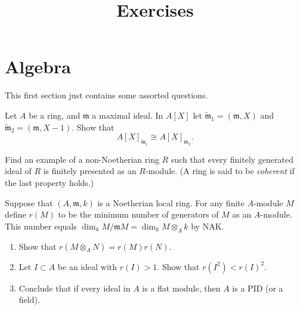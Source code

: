 

%


\title{Exercises}


\maketitle

\label{section-phantom}

\tableofcontents


\section{Algebra}
\label{section-algebra}

\noindent
This first section just contains some assorted questions.

\begin{exercise}
\label{exercise-isomorphism-localizations}
Let $A$ be a ring, and ${\mathfrak m}$ a maximal ideal. In $A[X]$
let $\tilde {\mathfrak m}_1 = ({\mathfrak m}, X)$ and
$\tilde {\mathfrak m}_2 = ({\mathfrak m}, X-1)$. Show
that
$$
A[X]_{\tilde {\mathfrak m}_1} \cong A[X]_{\tilde {\mathfrak m}_2}.
$$
\end{exercise}

\begin{exercise}
\label{exercise-coherent}
Find an example of a non-Noetherian ring $R$ such that every
finitely generated ideal of $R$ is finitely presented as an $R$-module.
(A ring is said to be {\it coherent} if the last property holds.)
\end{exercise}

\begin{exercise}
\label{exercise-flat-ideals-pid}
Suppose that $(A, {\mathfrak m}, k)$ is a Noetherian local ring. For any
finite $A$-module $M$ define $r(M)$ to be the minimum number
of generators of $M$ as an $A$-module. This number equals
$\dim_k M/{\mathfrak m} M = \dim_k M \otimes_A k$ by NAK.
\begin{enumerate}
\item Show that $r(M \otimes_A N) = r(M)r(N)$.
\item Let $I\subset A $ be an ideal with $r(I) > 1$. Show that
$r(I^2) < r(I)^2$.
\item Conclude that if every ideal in $A$ is a flat module, then
$A$ is a PID (or a field).
\end{enumerate}
\end{exercise}

